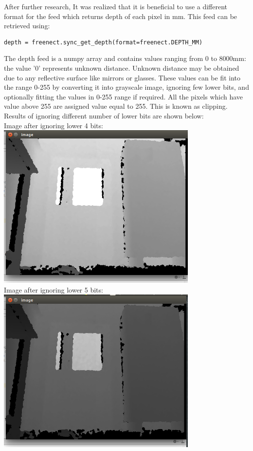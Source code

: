 \documentclass{report}
\begin{document}
After further research, It was realized that it is beneficial to use a different format for the feed which returns depth of each pixel 
in mm. This feed can be retrieved using: \\
\begin{lstlisting}
depth = freenect.sync_get_depth(format=freenect.DEPTH_MM)
\end{lstlisting}

The depth feed is a numpy array and contains values ranging from 0 to 8000mm: the value '0' represents unknown distance. Unknown distance may be 
obtained due to any reflective surface like mirrors or glasses. These values can be fit into the range 0-255 by converting it 
into grayscale image, ignoring few lower bits, and optionally fitting the values in 0-255 range if required. All the pixels which
have value above 255 are assigned value equal to 255. This is known as clipping. Results of ignoring different number of lower bits are shown below: \pagebreak
\\
Image after ignoring lower 4 bits: \\
\includegraphics[width = 10cm]{d_4bit.png} \\
Image after ignoring lower 5 bits: \\
\includegraphics[width = 10cm]{d_5bit.png} \\
\pagebreak
\end{document}
